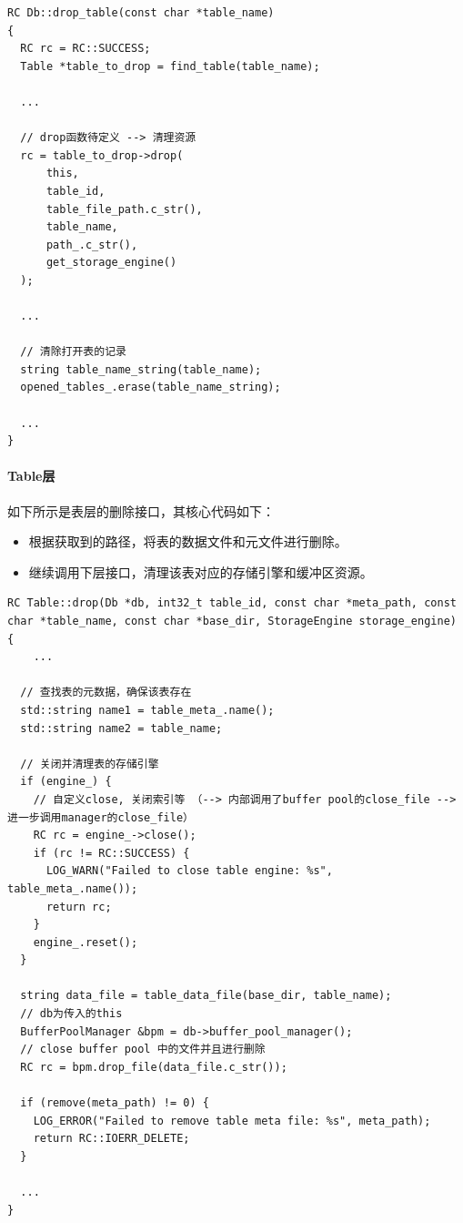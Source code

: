 \documentclass[a4paper, 12pt]{article}
\begin{document}
\begin{lstlisting}
RC Db::drop_table(const char *table_name)
{
  RC rc = RC::SUCCESS;
  Table *table_to_drop = find_table(table_name);

  ...

  // drop函数待定义 --> 清理资源
  rc = table_to_drop->drop(
      this,
      table_id,
      table_file_path.c_str(),
      table_name,
      path_.c_str(),
      get_storage_engine()
  );

  ...

  // 清除打开表的记录
  string table_name_string(table_name);
  opened_tables_.erase(table_name_string);

  ...
}
\end{lstlisting}

\paragraph{Table层}
如下所示是表层的删除接口，其核心代码如下：
\begin{itemize}
    \item 根据获取到的路径，将表的数据文件和元文件进行删除。
    \item 继续调用下层接口，清理该表对应的存储引擎和缓冲区资源。
\end{itemize}
\begin{lstlisting}
RC Table::drop(Db *db, int32_t table_id, const char *meta_path, const char *table_name, const char *base_dir, StorageEngine storage_engine)
{
    ...

  // 查找表的元数据，确保该表存在
  std::string name1 = table_meta_.name();
  std::string name2 = table_name;

  // 关闭并清理表的存储引擎
  if (engine_) {
    // 自定义close, 关闭索引等 （--> 内部调用了buffer pool的close_file --> 进一步调用manager的close_file）
    RC rc = engine_->close();
    if (rc != RC::SUCCESS) {
      LOG_WARN("Failed to close table engine: %s", table_meta_.name());
      return rc;
    }
    engine_.reset();
  }

  string data_file = table_data_file(base_dir, table_name);
  // db为传入的this
  BufferPoolManager &bpm = db->buffer_pool_manager();
  // close buffer pool 中的文件并且进行删除
  RC rc = bpm.drop_file(data_file.c_str());

  if (remove(meta_path) != 0) {
    LOG_ERROR("Failed to remove table meta file: %s", meta_path);
    return RC::IOERR_DELETE;
  }

  ...
}
\end{lstlisting}
\end{document}
